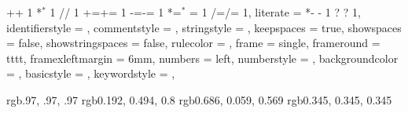 {    %
    {+}{{{\color{ipython_purple}+}}} 1
    {*}{{{\color{ipython_purple}$^\ast$}}} 1
    {/}{{{\color{ipython_purple}/}}} 1
    {+=}{{{+=}}} 1
    {-=}{{{-=}}} 1
    {*=}{{{$^\ast$ = }}} 1
    {/=}{{{/=}}} 1,
    literate = 
    *{-}{{{\color{ipython_purple} -}}} 1
     {?}{{{\color{ipython_purple} ?}}} 1,
    identifierstyle = \color{black}\ttfamily,
    commentstyle = \color{ipython_cyan}\ttfamily,
    stringstyle = \color{ipython_red}\ttfamily,
    keepspaces = true,
    showspaces = false,
    showstringspaces = false,
    rulecolor = \color{ipython_frame},
    frame = single,
    frameround = {t}{t}{t}{t},
    framexleftmargin = 6mm,
    numbers = left,
    numberstyle = \tiny\color{halfgray},
    backgroundcolor = \color{ipython_bg},
    basicstyle = \scriptsize,
    keywordstyle = \color{ipython_green}\ttfamily,
}


\geometry{verbose, tmargin = 2.5cm, bmargin = 2.5cm, lmargin = 2.5cm, rmargin = 2.5cm}

\definecolor{backgroundCol}  {rgb}{.97, .97, .97}
\definecolor{stringstyleCol} {rgb}{0.192, 0.494, 0.8}
\definecolor{NumCol}         {rgb}{0.686, 0.059, 0.569}
\definecolor{basicstyleCol}  {rgb}{0.345, 0.345, 0.345}

